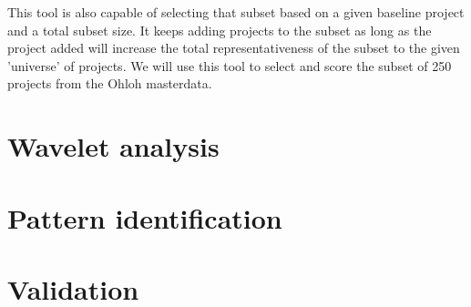 This tool is also capable of selecting that subset based on a given baseline
project and a total subset size. It keeps adding projects to the subset as long
as the project added will increase the total representativeness of the subset
to the given 'universe' of projects. We will use this tool to select and score
the subset of 250 projects from the Ohloh masterdata.



\section{Wavelet analysis}

\section{Pattern identification}

\section{Validation}

